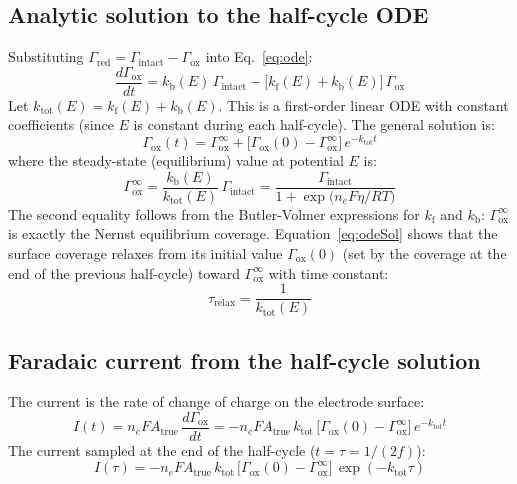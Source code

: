 \documentclass[10pt,a4paper]{article}
\numberwithin{equation}{section}
\newcommand{\kf}{k_{\text{f}}}
\newcommand{\kb}{k_{\text{b}}}
\newcommand{\Gox}{\Gamma_{\text{ox}}}
\newcommand{\Gred}{\Gamma_{\text{red}}}
\newcommand{\Gtot}{\Gamma_{\text{intact}}}
\begin{document}
\subsection{Analytic solution to the half-cycle ODE}

Substituting $\Gred = \Gtot - \Gox$ into Eq.~\eqref{eq:ode}:
\begin{equation}
  \frac{d\Gox}{dt} = \kb(E)\,\Gtot - \bigl[\kf(E) + \kb(E)\bigr]\,\Gox
  \label{eq:ode2}
\end{equation}
Let $k_{\text{tot}}(E) = \kf(E) + \kb(E)$. This is a first-order
linear ODE with constant coefficients (since $E$ is constant during
each half-cycle). The general solution is:
\begin{equation}
  \Gox(t) = \Gox^\infty + \bigl[\Gox(0) - \Gox^\infty\bigr]\,
  e^{-k_{\text{tot}} t}
  \label{eq:odeSol}
\end{equation}
where the steady-state (equilibrium) value at potential $E$ is:
\begin{equation}
  \Gox^\infty = \frac{\kb(E)}{k_{\text{tot}}(E)}\,\Gtot
  = \frac{\Gtot}{1 + \exp\!\bigl(n_e F\eta/RT\bigr)}
  \label{eq:Goxinf}
\end{equation}
The second equality follows from the Butler-Volmer expressions for
$\kf$ and $\kb$: $\Gox^\infty$ is exactly the Nernst equilibrium
coverage. Equation~\eqref{eq:odeSol} shows that the surface coverage
relaxes from its initial value $\Gox(0)$ (set by the coverage at the
end of the previous half-cycle) toward $\Gox^\infty$ with time constant:
\begin{equation}
  \tau_{\text{relax}} = \frac{1}{k_{\text{tot}}(E)}
  \label{eq:taurelax}
\end{equation}

\subsection{Faradaic current from the half-cycle solution}

The current is the rate of change of charge on the electrode surface:
\begin{equation}
  I(t) = n_e F A_{\text{true}}\,\frac{d\Gox}{dt}
  = -n_e F A_{\text{true}}\,k_{\text{tot}}\,
  \bigl[\Gox(0) - \Gox^\infty\bigr]\,e^{-k_{\text{tot}} t}
  \label{eq:It}
\end{equation}
The current sampled at the end of the half-cycle ($t = \tau = 1/(2f)$):
\begin{equation}
  I(\tau) = -n_e F A_{\text{true}}\,k_{\text{tot}}\,
  \bigl[\Gox(0) - \Gox^\infty\bigr]\,\exp(-k_{\text{tot}}\tau)
  \label{eq:Itau}
\end{equation}
\end{document}

